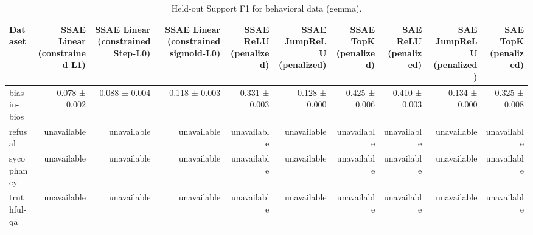 \begin{table}[t]
\centering
\caption{Held-out Support F1 for behavioral data (gemma).}
\label{tab:behavioral-gemma-support-f1}
\begin{tabular}{lrrrrrrrrr}
\toprule
Dataset & SSAE Linear (constrained L1) & SSAE Linear (constrained Step-L0) & SSAE Linear (constrained sigmoid-L0) & SSAE ReLU (penalized) & SSAE JumpReLU (penalized) & SSAE TopK (penalized) & SAE ReLU (penalized) & SAE JumpReLU (penalized) & SAE TopK (penalized) \\
\midrule
bias-in-bios & 0.078 ± 0.002 & 0.088 ± 0.004 & 0.118 ± 0.003 & 0.331 ± 0.003 & 0.128 ± 0.000 & 0.425 ± 0.006 & 0.410 ± 0.003 & 0.134 ± 0.000 & 0.325 ± 0.008 \\
refusal & unavailable & unavailable & unavailable & unavailable & unavailable & unavailable & unavailable & unavailable & unavailable \\
sycophancy & unavailable & unavailable & unavailable & unavailable & unavailable & unavailable & unavailable & unavailable & unavailable \\
truthful-qa & unavailable & unavailable & unavailable & unavailable & unavailable & unavailable & unavailable & unavailable & unavailable \\
\bottomrule
\end{tabular}
\end{table}
